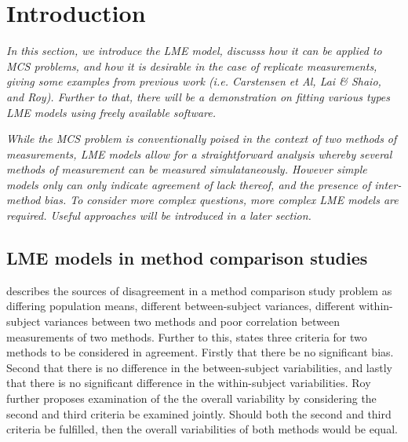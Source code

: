\documentclass[12pt, a4paper]{report}
\theoremstyle{plain}
\theoremstyle{definition}
\theoremstyle{remark}
\begin{document}
\chapter{Introduction}

\begin{framed}
	\textit{ In this section, we introduce the LME model, discusss how it can be applied to MCS problems, and how it is desirable in the case of replicate measurements, giving some examples from previous work (i.e. Carstensen et Al, Lai \& Shaio, and Roy). Further to that, there will be a demonstration on fitting various types LME models using freely available software.}
	
	\textit{ While the MCS problem is conventionally poised in the context of two methods of measurements, LME models allow for a straightforward analysis whereby several methods of measurement can be measured simulataneously. However simple models only can only indicate agreement of lack thereof, and the presence of inter-method bias. To consider more complex questions, more complex LME models are required.  Useful approaches will be introduced in a later section.
	}
\end{framed}


\section{LME models in method comparison studies}






\citet{Barnhart} describes the sources of disagreement in a method comparison study problem as
differing population means, different between-subject variances, different within-subject variances between two methods and poor
correlation between measurements of two methods. Further to this, \citet{ARoy2009} states three criteria for two methods to be considered in agreement. Firstly that there be no significant bias. Second that there is no difference in the between-subject variabilities, and lastly that there is no significant difference in the within-subject variabilities. 	Roy further proposes examination of the the overall variability by considering the second and third criteria be examined jointly. Should both the second and third criteria be fulfilled, then the overall variabilities of both methods would be equal.
\end{document}
